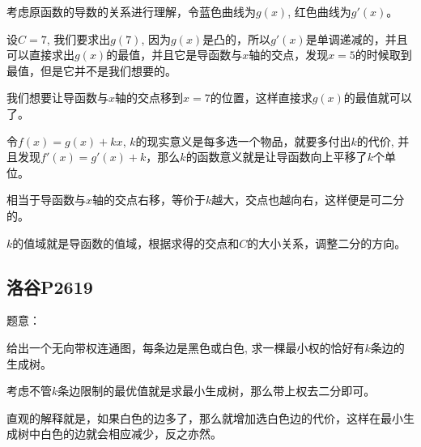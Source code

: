 考虑原函数的导数的关系进行理解，令蓝色曲线为$g(x)$, 红色曲线为$g'(x)$。\par
设$C = 7$, 我们要求出$g(7)$, 因为$g(x)$是凸的，所以$g'(x)$是单调递减的，并且可以直接求出$g(x)$的最值，并且它是导函数与$x$轴的交点，发现$x = 5$的时候取到最值，但是它并不是我们想要的。\par
我们想要让导函数与$x$轴的交点移到$x = 7$的位置，这样直接求$g(x)$的最值就可以了。\par
令$f(x) = g(x) + kx$, $k$的现实意义是每多选一个物品，就要多付出$k$的代价, 并且发现$f'(x) = g'(x) + k$，那么$k$的函数意义就是让导函数向上平移了$k$个单位。\par
相当于导函数与$x$轴的交点右移，等价于$k$越大，交点也越向右，这样便是可二分的。\par
$k$的值域就是导函数的值域，根据求得的交点和$C$的大小关系，调整二分的方向。\par


\subsection{洛谷P2619}

题意：\par
给出一个无向带权连通图，每条边是黑色或白色, 求一棵最小权的恰好有$k$条边的生成树。\par

考虑不管$k$条边限制的最优值就是求最小生成树，那么带上权去二分即可。\par
直观的解释就是，如果白色的边多了，那么就增加选白色边的代价，这样在最小生成树中白色的边就会相应减少，反之亦然。

